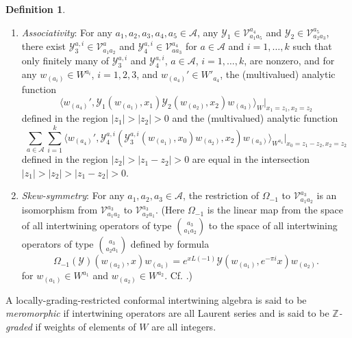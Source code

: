 \documentclass{amsproc}
\theoremstyle{definition}
\newtheorem{defn}[thm]{Definition}
\theoremstyle{remark}
\numberwithin{equation}{section}
\begin{document}
\begin{defn}
{\begin{enumerate}
\item {\it Associativity}:  For any $a_{1}, a_{2}, 
a_{3}, a_{4}, a_{5}\in \mathcal{A}$, 
any $\mathcal{Y}_{1}\in \mathcal{
V}_{a_{1}a_{5}}^{a_{4}}$ and $\mathcal{Y}_{2}\in\mathcal{
V}_{a_{2}a_{3}}^{a_{5}}$, there exist 
$\mathcal{Y}^{a, i}_{3}
\in \mathcal{
V}_{a_{1}a_{2}}^{a}$ and $\mathcal{Y}^{a,i}_{4}\in \mathcal{
V}_{aa_{3}}^{a_{4}}$ for $a\in \mathcal{A}$ and $i=1, \dots, k$
such that only finitely many of $\mathcal{Y}^{a, i}_{3}$ and 
$\mathcal{Y}^{a,i}_{4}$, 
$a\in \mathcal{A}$, $i=1, \dots, k$, are nonzero, and 
for any $w_{(a_{i})}\in W^{a_{i}}$, $i=1, 2, 3$, and $w_{(a_{4})}'
\in W'_{a_{4}}$,
the (multivalued) analytic function 
\begin{equation}\label{prod}
\langle w_{(a_{4})}', 
\mathcal{Y}_{1}(w_{(a_{1})}, x_{1})\mathcal{Y}_{2}(w_{(a_{2})}, 
x_{2})w_{(a_{3})}\rangle_{W}|_{x_{1}=z_{1},
x_{2}=z_{2}}
\end{equation}
defined in the region
$|z_{1}|>|z_{2}|>0$ 
and the (multivalued) analytic function
\begin{equation}\label{iter}
\sum_{a\in \mathcal{A}}\sum_{i=1}^{k}
\langle w_{(a_{4})}', \mathcal{Y}^{a, i}_{4}
(\mathcal{Y}^{a, i}_{3}(w_{(a_{1})},
x_{0})w_{(a_{2})}, x_{2})w_{(a_{3})}\rangle_{W^{a_{4}}}
|_{x_{0}=z_{1}-z_{2},
x_{2}=z_{2}}
\end{equation} 
defined in the region
$|z_{2}|>|z_{1}-z_{2}|>0$ are equal in the intersection
$|z_{1}|> |z_{2}|>|z_{1}-z_{2}|>0$.



\item {\it Skew-symmetry}:  For any $a_{1}, a_{2}, 
a_{3}\in \mathcal{A}$, the restriction of  $\Omega_{-1}$ to
$\mathcal{V}_{a_{1}a_{2}}^{a_{3}}$ is an isomorphism from
$\mathcal{V}_{a_{1}a_{2}}^{a_{3}}$ to 
$\mathcal{V}_{a_{2}a_{1}}^{a_{3}}$. (Here
$\Omega_{-1}$ is the linear map
from the space of all intertwining operators of type
$\binom{a_{3}}{a_{1}a_{2}}$ to the space of 
all intertwining operators of type
$\binom{a_{3}}{a_{2}a_{1}}$ defined by
formula
$$
\Omega_{-1}(\mathcal{Y})(w_{(a_{2})},x)w_{(a_{1})} = e^{xL(-1)}
\mathcal{Y}(w_{(a_{1})},e^{-\pi i}x)w_{(a_{2})}.
$$
for  $w_{(a_{1})}\in W^{a_{1}}$ and $w_{(a_{2})}\in W^{a_{2}}$.
Cf. \cite{HL2}.)


\end{enumerate}

A locally-grading-restricted conformal 
intertwining algebra is said to be {\it meromorphic} if 
intertwining operators are all Laurent series and is said to be 
{\it $\mathbb{Z}$-graded} if weights of elements of $W$ are 
all integers.

}
\end{defn}
\end{document}
